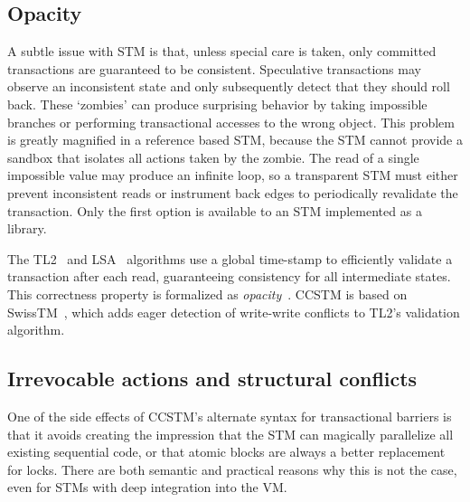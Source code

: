 \subsection{Opacity}

A subtle issue with STM is that, unless special care is taken, only
committed transactions are guaranteed to be consistent.  Speculative
transactions may observe an inconsistent state and only subsequently
detect that they should roll back.  These `zombies' can produce
surprising behavior by taking impossible branches or performing
transactional accesses to the wrong object.  This problem is greatly
magnified in a reference based STM, because the STM cannot provide a
sandbox that isolates all actions taken by the zombie.  The read of a
single impossible value may produce an infinite loop, so a transparent
STM must either prevent inconsistent reads or instrument back edges
to periodically revalidate the transaction.  Only the first option is
available to an STM implemented as a library.

The TL2~\cite{dice06tl2} and LSA~\cite{riegel06lsa} algorithms
use a global time-stamp to efficiently validate
a transaction after each read, guaranteeing consistency for all
intermediate states.  This correctness property is formalized
as \textit{opacity}~\cite{guerraoui08opacity}.  CCSTM is based on
SwissTM~\cite{dragojevic09swisstm}, which adds eager detection of
write-write conflicts to TL2's validation algorithm.

\subsection{Irrevocable actions and structural conflicts}

One of the side effects of CCSTM's alternate syntax for transactional barriers
is that it avoids creating the impression that the STM can magically
parallelize all existing sequential code, or that atomic blocks are
always a better replacement for locks.  There are both semantic and
practical reasons why this is not the case, even for STMs with deep
integration into the VM.

